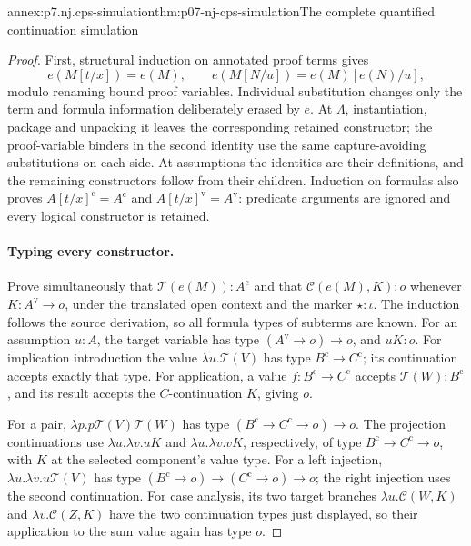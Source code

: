 \begin{annexitem}{annex:p7.nj.cps-simulation}{thm:p07-nj-cps-simulation}{The complete quantified continuation simulation}
\begin{proof}
First, structural induction on annotated proof terms gives
\[
 e(M[t/x])=e(M),\qquad
 e(M[N/u])=e(M)[e(N)/u],
\]
modulo renaming bound proof variables. Individual substitution
changes only the term and formula information deliberately
erased by \(e\). At \(\Lambda\), instantiation, package and
unpacking it leaves the corresponding retained constructor;
the proof-variable binders in the second identity use the same
capture-avoiding substitutions on each side. At assumptions
the identities are their definitions, and the remaining
constructors follow from their children. Induction on formulas
also proves \(A[t/x]^{\mathrm c}=A^{\mathrm c}\) and
\(A[t/x]^{\mathrm v}=A^{\mathrm v}\): predicate arguments
are ignored and every logical constructor is retained.

\paragraph{Typing every constructor.}
Prove simultaneously that \(\mathcal T(e(M)):A^{\mathrm c}\)
and that \(\mathcal C(e(M),K):o\) whenever
\(K:A^{\mathrm v}\to o\), under the translated open context
and the marker \(\star:\iota\). The induction follows the
source derivation, so all formula types of subterms are known.
For an assumption \(u:A\), the target variable has type
\((A^{\mathrm v}\to o)\to o\), and \(uK:o\).
For implication introduction the value
\(\lambda u.\mathcal T(V)\) has type
\(B^{\mathrm c}\to C^{\mathrm c}\); its continuation accepts
exactly that type. For application, a value
\(f:B^{\mathrm c}\to C^{\mathrm c}\) accepts
\(\mathcal T(W):B^{\mathrm c}\), and its result accepts
the \(C\)-continuation \(K\), giving \(o\).

For a pair, \(\lambda p.p\mathcal T(V)\mathcal T(W)\)
has type \((B^{\mathrm c}\to C^{\mathrm c}\to o)\to o\).
The projection continuations use
\(\lambda u.\lambda v.uK\) and
\(\lambda u.\lambda v.vK\), respectively, of type
\(B^{\mathrm c}\to C^{\mathrm c}\to o\), with \(K\)
at the selected component's value type. For a left injection,
\(\lambda u.\lambda v.u\mathcal T(V)\) has type
\((B^{\mathrm c}\to o)\to(C^{\mathrm c}\to o)\to o\);
the right injection uses the second continuation. For case
analysis, its two target branches
\(\lambda u.\mathcal C(W,K)\) and
\(\lambda v.\mathcal C(Z,K)\) have the two continuation
types just displayed, so their application to the sum value
again has type \(o\).


\end{proof}
\end{annexitem}
